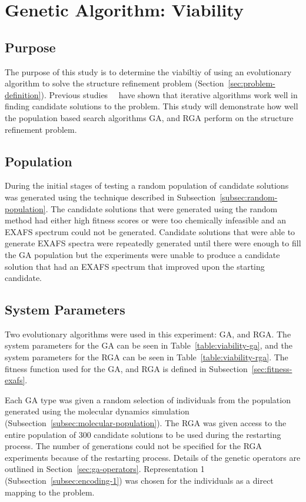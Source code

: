 \section{Genetic Algorithm: Viability}
\label{sec:ga-viability}

\subsection{Purpose}

The purpose of this study is to determine the viabiltiy of using an evolutionary algorithm to solve the structure refinement problem (Section~\ref{sec:problem-definition}). Previous studies~\cite{sproviero2008model}~\cite{luber2011s1} have shown that iterative algorithms work well in finding candidate solutions to the problem. This study will demonstrate how well the population based search algorithms GA, and RGA perform on the structure refinement problem.

\subsection{Population}

During the initial stages of testing a random population of candidate solutions was generated using the technique described in Subsection~\ref{subsec:random-population}. The candidate solutions that were generated using the random method had either high fitness scores or were too chemically infeasible and an EXAFS spectrum could not be generated. Candidate solutions that were able to generate EXAFS spectra were repeatedly generated until there were enough to fill the GA population but the experiments were unable to produce a candidate solution that had an EXAFS spectrum that improved upon the starting candidate.

\subsection{System Parameters}

Two evolutionary algorithms were used in this experiment: GA, and RGA. The system parameters for the GA can be seen in Table~\ref{table:viability-ga}, and the system parameters for the RGA can be seen in Table~\ref{table:viability-rga}. The fitness function used for the GA, and RGA is defined in Subsection~\ref{sec:fitness-exafs}.

Each GA type was given a random selection of individuals from the population generated using the molecular dynamics simulation (Subsection~\ref{subsec:molecular-population}). The RGA was given access to the entire population of 300 candidate solutions to be used during the restarting process. The number of generations could not be specified for the RGA experiments because of the restarting process. Details of the genetic operators are outlined in Section~\ref{sec:ga-operators}. Representation 1 (Subsection~\ref{subsec:encoding-1}) was chosen for the individuals as a direct mapping to the problem.

